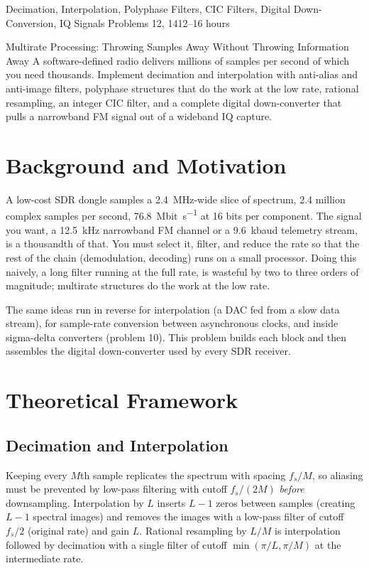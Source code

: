 \documentclass[11pt,a4paper]{article}
\begin{document}
%
{Decimation, Interpolation, Polyphase Filters, CIC Filters, Digital Down-Conversion, IQ Signals}%
{Problems 12, 14}{12--16 hours}

\begin{summarybox}{Multirate Processing: Throwing Samples Away Without Throwing Information Away}
A software-defined radio delivers millions of samples per second of which you need thousands. Implement decimation and interpolation with anti-alias and anti-image filters, polyphase structures that do the work at the low rate, rational resampling, an integer CIC filter, and a complete digital down-converter that pulls a narrowband FM signal out of a wideband IQ capture.
\end{summarybox}


\section*{Background and Motivation}
A low-cost SDR dongle samples a \SI{2.4}{\mega\hertz}-wide slice of spectrum, 2.4 million complex samples per second, \SI{76.8}{\mega bit\per\second} at 16 bits per component. The signal you want, a \SI{12.5}{\kilo\hertz} narrowband FM channel or a \SI{9.6}{\kilo baud} telemetry stream, is a thousandth of that. You must select it, filter, and reduce the rate so that the rest of the chain (demodulation, decoding) runs on a small processor. Doing this naively, a long filter running at the full rate, is wasteful by two to three orders of magnitude; multirate structures do the work at the low rate.

The same ideas run in reverse for interpolation (a DAC fed from a slow data stream), for sample-rate conversion between asynchronous clocks, and inside sigma-delta converters (problem 10). This problem builds each block and then assembles the digital down-converter used by every SDR receiver.

\section*{Theoretical Framework}
\subsection{Decimation and Interpolation}
Keeping every $M$th sample replicates the spectrum with spacing $f_s/M$, so aliasing must be prevented by low-pass filtering with cutoff $f_s/(2M)$ \emph{before} downsampling. Interpolation by $L$ inserts $L-1$ zeros between samples (creating $L-1$ spectral images) and removes the images with a low-pass filter of cutoff $f_s/2$ (original rate) and gain $L$. Rational resampling by $L/M$ is interpolation followed by decimation with a single filter of cutoff $\min(\pi/L,\pi/M)$ at the intermediate rate.
\end{document}
